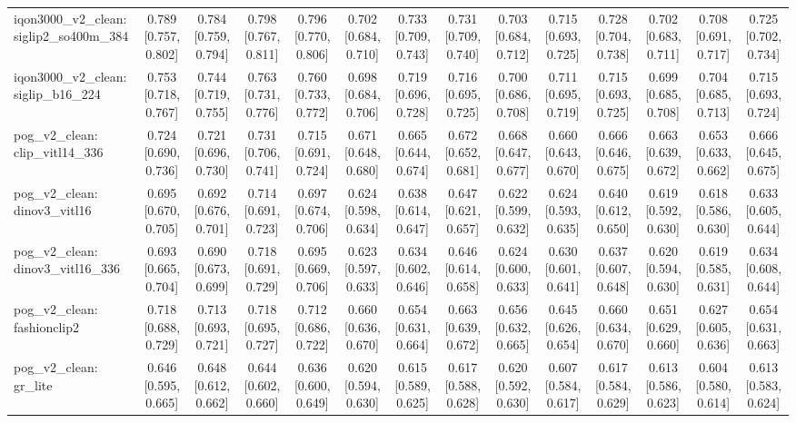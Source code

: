 \begin{table}[t]
\begin{tabular}{lccccccccccccc}
iqon3000\_v2\_clean: siglip2\_so400m\_384 & 0.789 [0.757, 0.802] & 0.784 [0.759, 0.794] & 0.798 [0.767, 0.811] & 0.796 [0.770, 0.806] & 0.702 [0.684, 0.710] & 0.733 [0.709, 0.743] & 0.731 [0.709, 0.740] & 0.703 [0.684, 0.712] & 0.715 [0.693, 0.725] & 0.728 [0.704, 0.738] & 0.702 [0.683, 0.711] & 0.708 [0.691, 0.717] & 0.725 [0.702, 0.734] \\
iqon3000\_v2\_clean: siglip\_b16\_224 & 0.753 [0.718, 0.767] & 0.744 [0.719, 0.755] & 0.763 [0.731, 0.776] & 0.760 [0.733, 0.772] & 0.698 [0.684, 0.706] & 0.719 [0.696, 0.728] & 0.716 [0.695, 0.725] & 0.700 [0.686, 0.708] & 0.711 [0.695, 0.719] & 0.715 [0.693, 0.725] & 0.699 [0.685, 0.708] & 0.704 [0.685, 0.713] & 0.715 [0.693, 0.724] \\
pog\_v2\_clean: clip\_vitl14\_336 & 0.724 [0.690, 0.736] & 0.721 [0.696, 0.730] & 0.731 [0.706, 0.741] & 0.715 [0.691, 0.724] & 0.671 [0.648, 0.680] & 0.665 [0.644, 0.674] & 0.672 [0.652, 0.681] & 0.668 [0.647, 0.677] & 0.660 [0.643, 0.670] & 0.666 [0.646, 0.675] & 0.663 [0.639, 0.672] & 0.653 [0.633, 0.662] & 0.666 [0.645, 0.675] \\
pog\_v2\_clean: dinov3\_vitl16 & 0.695 [0.670, 0.705] & 0.692 [0.676, 0.701] & 0.714 [0.691, 0.723] & 0.697 [0.674, 0.706] & 0.624 [0.598, 0.634] & 0.638 [0.614, 0.647] & 0.647 [0.621, 0.657] & 0.622 [0.599, 0.632] & 0.624 [0.593, 0.635] & 0.640 [0.612, 0.650] & 0.619 [0.592, 0.630] & 0.618 [0.586, 0.630] & 0.633 [0.605, 0.644] \\
pog\_v2\_clean: dinov3\_vitl16\_336 & 0.693 [0.665, 0.704] & 0.690 [0.673, 0.699] & 0.718 [0.691, 0.729] & 0.695 [0.669, 0.706] & 0.623 [0.597, 0.633] & 0.634 [0.602, 0.646] & 0.646 [0.614, 0.658] & 0.624 [0.600, 0.633] & 0.630 [0.601, 0.641] & 0.637 [0.607, 0.648] & 0.620 [0.594, 0.630] & 0.619 [0.585, 0.631] & 0.634 [0.608, 0.644] \\
pog\_v2\_clean: fashionclip2 & 0.718 [0.688, 0.729] & 0.713 [0.693, 0.721] & 0.718 [0.695, 0.727] & 0.712 [0.686, 0.722] & 0.660 [0.636, 0.670] & 0.654 [0.631, 0.664] & 0.663 [0.639, 0.672] & 0.656 [0.632, 0.665] & 0.645 [0.626, 0.654] & 0.660 [0.634, 0.670] & 0.651 [0.629, 0.660] & 0.627 [0.605, 0.636] & 0.654 [0.631, 0.663] \\
pog\_v2\_clean: gr\_lite & 0.646 [0.595, 0.665] & 0.648 [0.612, 0.662] & 0.644 [0.602, 0.660] & 0.636 [0.600, 0.649] & 0.620 [0.594, 0.630] & 0.615 [0.589, 0.625] & 0.617 [0.588, 0.628] & 0.620 [0.592, 0.630] & 0.607 [0.584, 0.617] & 0.617 [0.584, 0.629] & 0.613 [0.586, 0.623] & 0.604 [0.580, 0.614] & 0.613 [0.583, 0.624] \\

\end{tabular}
\end{table}
